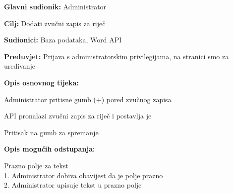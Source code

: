 					
					\noindent {}
					\begin{packed_item}
						\item \textbf{Glavni sudionik:} Administrator
						\item \textbf{Cilj:} Dodati zvučni zapis za riječ
						\item \textbf{Sudionici:} Baza podataka, Word API
						\item \textbf{Preduvjet:} Prijava s administratorskim privilegijama, na stranici smo za uređivanje
						\item \textbf{Opis osnovnog tijeka:}
						\begin{packed_enum}
							\item Administrator pritisne gumb (+) pored zvučnog zapisa
							\item API pronalazi zvučni zapis za riječ i postavlja je
							\item Pritisak na gumb za spremanje
						\end{packed_enum}
						\item \textbf{Opis mogućih odstupanja:}
						\begin{packed_item}
							\item [1.a] Prazno polje za tekst
							\\1. Administrator dobiva obavijest da je polje prazno
							\\2. Administrator upisuje tekst u prazno polje
						\end{packed_item}
					\end{packed_item}
					
